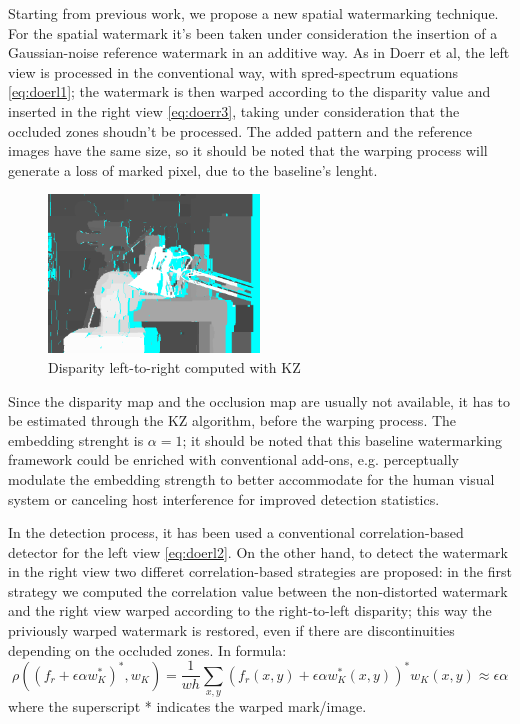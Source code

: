 Starting from previous work, we propose a new spatial watermarking technique. \newline
For the spatial watermark it's been taken under consideration the insertion of a Gaussian-noise reference watermark in an additive way.\newline
As in Doerr et al, the left view is processed in the conventional way, with spred-spectrum equations \ref{eq:doerl1}; the watermark is then warped according to the disparity value and inserted in the right view \ref{eq:doerr3}, taking under consideration that the occluded zones shoudn't be processed.\newline
The added pattern and the reference images have the same size, so it should be noted that the warping process will generate a loss of marked pixel, due to the baseline's lenght.\newline
\begin{figure}[h!]
\centering
\includegraphics[width=0.5\textwidth]{./img/disp_left_to_right.png}
\caption{\small{Disparity left-to-right computed with KZ}}
\label{fig:kzdisplr}
\end{figure}
Since the disparity map and the occlusion map are usually not available, it has to be estimated through the KZ algorithm, before the warping process.\newline
The embedding strenght is $\alpha=1$; it should be noted that this baseline watermarking framework could be enriched with conventional add-ons, e.g. perceptually modulate the embedding strength to better accommodate for the human visual system or canceling host interference for improved detection statistics.\newline

In the detection process, it has been used a conventional correlation-based detector for the left view \ref{eq:doerl2}.\newline 
On the other hand, to detect the watermark in the right view two differet correlation-based strategies are proposed:
in the first strategy we computed the correlation value between the non-distorted watermark and the right view warped according to the right-to-left disparity; this way the priviously warped watermark is restored, even if there are discontinuities depending on the occluded zones. In formula:
$$\rho((f_{r}+\epsilon\alpha w_{K}^{*})^{*},w_{K})= \frac{1}{wh}\sum_{x,y}(f_{r}(x,y)+\epsilon\alpha w_{K}^{*}(x,y))^{*}w_{K}(x,y)\approx\epsilon\alpha $$
where the superscript * indicates the warped mark/image.\newline

